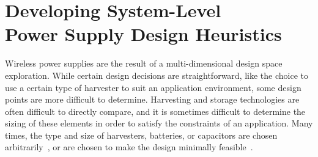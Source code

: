 \chapter[Developing System-Level Power Supply Design Heuristics][Developing System-Level Design Heuristics]{
Developing System-Level
\\
Power Supply Design Heuristics
}

\label{chap:intuition}

Wireless power supplies are the result of a multi-dimensional design space exploration.
While certain design decisions are straightforward, like the choice to use a certain type of harvester to suit an application environment, some design points are more difficult to determine.
Harvesting and storage technologies are often difficult to directly compare, and it is sometimes difficult to determine the sizing of these elements in order to satisfy the constraints of an application.
Many times, the type and size of harvesters, batteries, or capacitors are chosen arbitrarily~\cite{hamiltoniot,lee2013modular,juang2002energy}, or are chosen to make the design minimally feasible~\cite{yervaGrafting12,debruin2013monjolo,hesterFlicker17,afanasov2020battery}.

